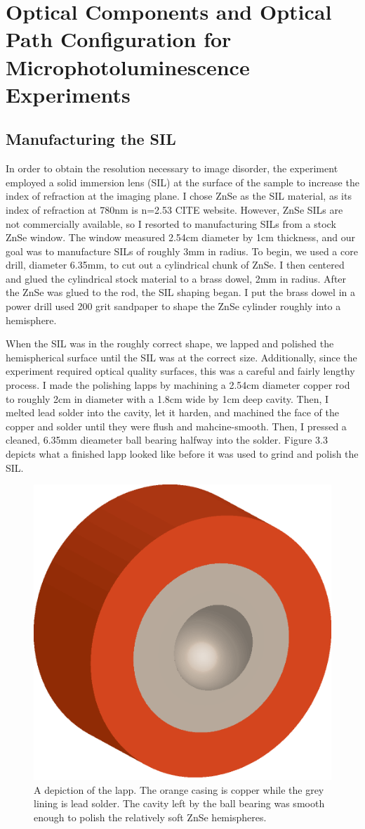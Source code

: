 \section{Optical Components and Optical Path Configuration for Microphotoluminescence Experiments}

\subsection{Manufacturing the SIL}

\indent In order to obtain the resolution necessary to image disorder, the experiment employed a solid immersion lens (SIL) at the surface of the sample to increase the index of refraction at the imaging plane. I chose ZnSe as the SIL material, as its index of refraction at 780nm is n=2.53 CITE website. However, ZnSe SILs are not commercially available, so I resorted to manufacturing SILs from a stock ZnSe window. The window measured 2.54cm diameter by 1cm thickness, and our goal was to manufacture SILs of roughly 3mm in radius. To begin, we used a core drill, diameter 6.35mm, to cut out a cylindrical chunk of ZnSe. I then centered and glued the cylindrical stock material to a brass dowel, 2mm in radius. After the ZnSe was glued to the rod, the SIL shaping began. I put the brass dowel in a power drill used 200 grit sandpaper to shape the ZnSe cylinder roughly into a hemisphere.

\indent  When the SIL was in the roughly correct shape, we lapped and polished the hemispherical surface until the SIL was at the correct size. Additionally, since the experiment required optical quality surfaces, this was a careful and fairly lengthy process. I made the polishing lapps by machining a 2.54cm diameter copper rod to roughly 2cm in diameter with a 1.8cm wide by 1cm deep cavity. Then, I melted lead solder into the cavity, let it harden, and machined the face of the copper and solder until they were flush and mahcine-smooth. Then, I pressed a cleaned, 6.35mm dieameter ball bearing halfway into the solder. Figure 3.3 depicts what a finished lapp looked like before it was used to grind and polish the SIL. 

\begin{figure}[h!]
\centering
\includegraphics[width = .3\textwidth]{lapp.eps}
\caption{ \doublespacing A depiction of the lapp. The orange casing is copper while the grey lining is lead solder. The cavity left by the ball bearing was smooth enough to polish the relatively soft ZnSe hemispheres.}
\label{lapp}
\end{figure}



